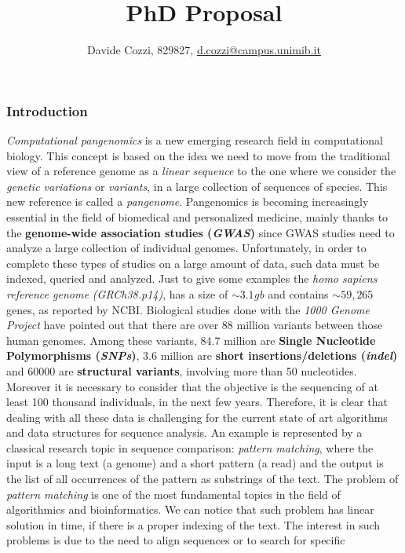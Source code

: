 \documentclass[a4paper,11pt, oneside]{article}
\title{\vspace{-1.75cm}PhD Proposal}
\author{Davide Cozzi, 829827,
  \href{mailto:d.cozzi@campus.unimib.it}{d.cozzi@campus.unimib.it}}
\date{}
\begin{document}
\maketitle
{}
\subsubsection*{Introduction}
\textit{Computational pangenomics} is a new emerging research field in
computational biology. This concept is based on the idea we need to move
from the traditional view of a reference genome as a \textit{linear sequence} to
the one where we consider the \textit{genetic variations} or \textit{variants},
in a large collection of sequences of species. This new reference is called a
\emph{pangenome}.  
Pangenomics is becoming increasingly essential in the
field of biomedical and personalized medicine, mainly thanks to the
\textbf{genome-wide association studies (\textit{GWAS})} since GWAS studies need
to analyze a large collection of individual genomes.  Unfortunately, in 
order to complete these types of studies on a large amount of data, such data
must be indexed, queried and analyzed. Just to give some examples the
\textit{homo sapiens reference genome (GRCh38.p14)}, 
has a size of $\sim 3.1$\textit{gb} and contains $\sim 59,265$ genes, as
reported by NCBI. Biological studies done with the \textit{1000 Genome Project}
have pointed out that there are over 88 
million variants between those human genomes. Among these variants, 84.7 million
are \textbf{Single Nucleotide Polymorphisms (\textit{SNPs})}, 3.6 million are
\textbf{short insertions/deletions (\textit{indel})} and 60000 are
\textbf{structural variants}, involving more than 50 nucleotides. Moreover it is
necessary to consider that the objective is the sequencing of at least 100
thousand individuals, in the next few years. Therefore, it is clear that dealing
with  all these data is challenging for the current state of art algorithms and
data structures for sequence analysis. 
An example is represented by a classical research topic in sequence comparison:
\textit{pattern matching}, where the input is a long text (a
genome) and a short pattern (a read) and the output is the list of all
occurrences of the pattern as substrings of the text.  
The problem of \textit{pattern matching} is one of the most
fundamental topics in 
the field of algorithmics and bioinformatics. We can notice that such problem
has linear solution in time, if there is a proper indexing of the text. The
interest in such 
problems is due to the need to align sequences or to search for specific
\end{document}
